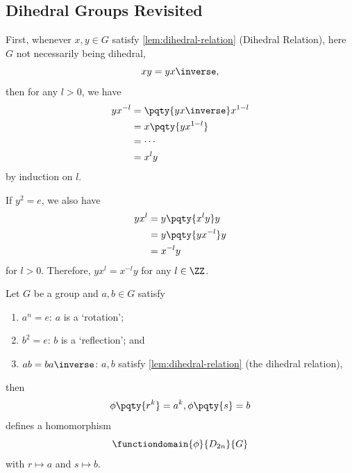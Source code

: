 \subsection{Dihedral Groups Revisited}
\label{sec:dihedral-group-revisited}
\begin{remark}
    First, whenever \(x, y \in G\) satisfy \autoref{lem:dihedral-relation} (Dihedral Relation), here \(G\) not necessarily being dihedral,
    \[
        xy = y x\inverse,
    \]
    then for any \(l > 0\), we have
    \begin{align*}
        y x^{-l} &= \pqty{y x \inverse} x^{1 - l} \\
        &= x \pqty{y x^{1 - l}} \\
        &= \cdots\\
        &= x^l y
    \end{align*}
    by induction on \(l\).

    If \(y^2 = e\), we also have
    \begin{align*}
        y x^l &= y \pqty{x^l y} y \\
        &= y \pqty{y x^{-l}} y \\
        &= x^{-l} y
    \end{align*}
    for \(l > 0\). Therefore, \(y x^l = x^{-l} y\) for any \(l \in \ZZ\).
\end{remark}

\begin{lemma}
    \label{lem:homomorphism-dihedral-group}
    Let \(G\) be a group and \(a, b \in G\) satisfy
    \begin{enumerate}
        \item \(a^n = e\): \(a\) is a `rotation';
        \item \(b^2 = e\): \(b\) is a `reflection'; and
        \item \(ab = b a\inverse\): \(a, b\) satisfy \autoref{lem:dihedral-relation} (the dihedral relation),
    \end{enumerate}
    then
    \[
    \phi \pqty{r^k} = a^k, \phi \pqty{s} = b
    \]
    defines a homomorphism
    \[
        \functiondomain{\phi}{D_{2n}}{G}
    \]
    with \(r \mapsto a\) and \(s \mapsto b\).
\end{lemma}

